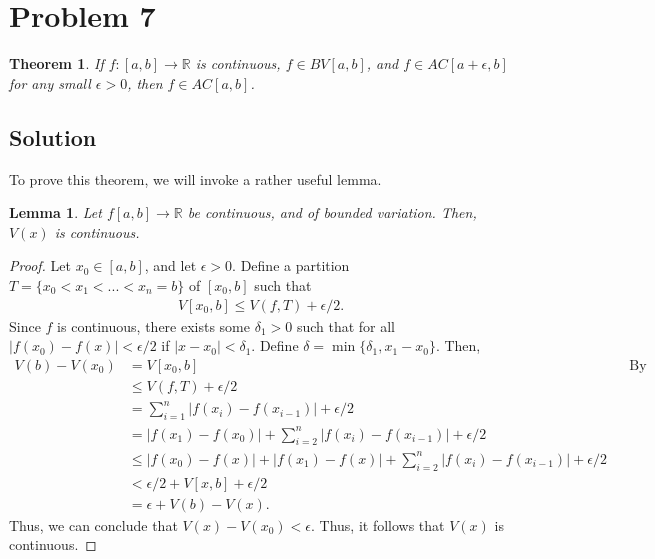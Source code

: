 \documentclass[10pt,a4paper]{article}
\theoremstyle{theorem}
\newtheorem{theorem}{Theorem}
\newtheorem{lemma}{Lemma}
\theoremstyle{definition}
\begin{document}
\section*{Problem 7}
\begin{theorem}
If $f:[a, b] \to \mathbb{R}$ is continuous, $f \in BV[a, b]$, and $f \in AC[a + \epsilon, b]$ for any small $\epsilon > 0$, then $f \in AC[a, b]$.
\end{theorem}

\subsection*{Solution}
To prove this theorem, we will invoke a rather useful lemma.
\begin{lemma}
Let $f[a, b] \to \mathbb{R}$ be continuous, and of bounded variation. Then, $V(x)$ is continuous.
\end{lemma}

\begin{proof}
Let $x_0 \in [a, b]$, and let $\epsilon > 0$. Define a partition $T = \{x_0 < x_1 <...< x_n = b\}$ of $[x_0, b]$ such that 
\begin{align*}
V[x_0, b] \leq V(f, T) + \epsilon/2.
\end{align*} 
Since $f$ is continuous, there exists some $\delta_1 > 0$ such that for all $|f(x_0) - f(x)| < \epsilon/2$ if $|x - x_0| < \delta_1$. Define $\delta = \min\{\delta_1, x_1 - x_0\}$. Then,
\begin{align*}
V(b) - V(x_0) &= V[x_0, b] &&\text{By theorem 2.2 in our textbook}\\
&\leq V(f, T) + \epsilon/2\\
&= \sum_{i=1}^n |f(x_i) - f(x_{i-1})| + \epsilon/2\\
&= |f(x_1) - f(x_{0})| + \sum_{i=2}^n |f(x_i) - f(x_{i-1})| + \epsilon/2\\
&\leq |f(x_0) - f(x)| + |f(x_1) - f(x)| + \sum_{i=2}^n |f(x_i) - f(x_{i-1})| + \epsilon/2\\
&< \epsilon/2 + V[x, b] + \epsilon/2\\
&= \epsilon + V(b) - V(x).
\end{align*}
Thus, we can conclude that $V(x) - V(x_0) < \epsilon$. Thus, it follows that $V(x)$ is continuous.
\end{proof}
\end{document}
